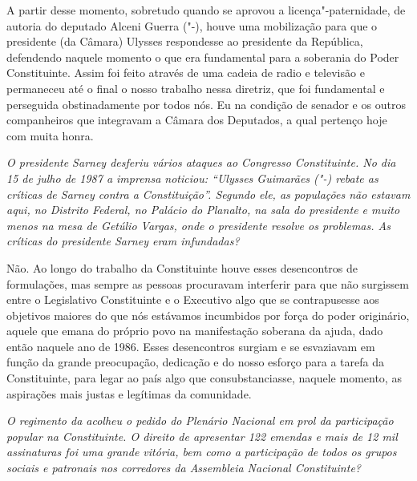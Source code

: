 A partir desse momento, sobretudo quando se aprovou a
licença"-paternidade, de autoria do deputado Alceni Guerra ("-),
houve uma mobilização para que o presidente (da Câmara) Ulysses
respondesse ao presidente da República, defendendo naquele momento o que
era fundamental para a soberania do Poder Constituinte. Assim foi feito
através de uma cadeia de radio e televisão e permaneceu até o final o
nosso trabalho nessa diretriz, que foi fundamental e perseguida
obstinadamente por todos nós. Eu na condição de senador e os outros
companheiros que integravam a Câmara dos Deputados, a qual pertenço hoje
com muita honra.

\medskip

\noindent\emph{O presidente Sarney desferiu vários ataques ao Congresso
Constituinte. No dia 15 de julho de 1987 a imprensa noticiou: ``Ulysses
Guimarães ("-) rebate as críticas de Sarney contra a Constituição''.
Segundo ele, as populações não estavam aqui, no Distrito Federal, no
Palácio do Planalto, na sala do presidente e muito menos na mesa de
Getúlio Vargas, onde o presidente resolve os problemas. As críticas do
presidente Sarney eram infundadas?}

Não. Ao longo do trabalho da Constituinte houve
esses desencontros de formulações, mas sempre as pessoas procuravam
interferir para que não surgissem entre o Legislativo Constituinte e o
Executivo algo que se contrapusesse aos objetivos maiores do que nós
estávamos incumbidos por força do poder originário, aquele que emana do
próprio povo na manifestação soberana da ajuda, dado então naquele ano
de 1986. Esses desencontros surgiam e se esvaziavam em função da grande
preocupação, dedicação e do nosso esforço para a tarefa da Constituinte,
para legar ao país algo que consubstanciasse, naquele momento, as
aspirações mais justas e legítimas da comunidade.

\medskip

\noindent\emph{O regimento da  acolheu o pedido do Plenário Nacional em prol
da participação popular na Constituinte. O direito de apresentar 122
emendas e mais de 12 mil assinaturas foi uma grande vitória, bem como a
participação de todos os grupos sociais e patronais nos corredores da
Assembleia Nacional Constituinte?}

